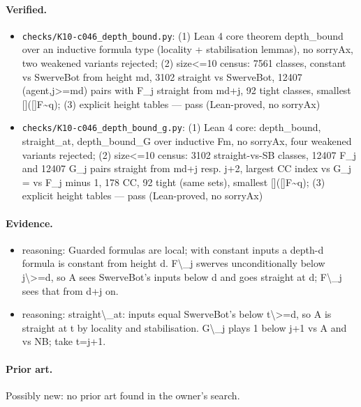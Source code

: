 \documentclass{article}
\begin{document}
\paragraph{Verified.}
\begin{itemize}
\item \texttt{checks/K10-c046\_depth\_bound.py}: (1) Lean 4 core theorem depth\_bound over an inductive formula type (locality + stabilisation lemmas), no sorryAx, two weakened variants rejected; (2) size\textless{}=10 census: 7561 classes, constant vs SwerveBot from height md, 3102 straight vs SwerveBot, 12407 (agent,j\textgreater{}=md) pairs with F\_j straight from md+j, 92 tight classes, smallest []([]F\textbar{}\textasciitilde{}q); (3) explicit height tables --- pass (Lean-proved, no sorryAx)
\item \texttt{checks/K10-c046\_depth\_bound\_g.py}: (1) Lean 4 core: depth\_bound, straight\_at, depth\_bound\_G over inductive Fm, no sorryAx, four weakened variants rejected; (2) size\textless{}=10 census: 3102 straight-vs-SB classes, 12407 F\_j and 12407 G\_j pairs straight from md+j resp. j+2, largest CC index vs G\_j = vs F\_j minus 1, 178 CC, 92 tight (same sets), smallest []([]F\textbar{}\textasciitilde{}q); (3) explicit height tables --- pass (Lean-proved, no sorryAx)
\end{itemize}

\paragraph{Evidence.}
\begin{itemize}
\item reasoning: Guarded formulas are local; with constant inputs a depth-d formula is constant from height d. F\textbackslash{}\_j swerves unconditionally below j\textbackslash{}\textgreater{}=d, so A sees SwerveBot's inputs below d and goes straight at d; F\textbackslash{}\_j sees that from d+j on.
\item reasoning: straight\textbackslash{}\_at: inputs equal SwerveBot's below t\textbackslash{}\textgreater{}=d, so A is straight at t by locality and stabilisation. G\textbackslash{}\_j plays 1 below j+1 vs A and vs NB; take t=j+1.
\end{itemize}

\paragraph{Prior art.} Possibly new: no prior art found in the owner's search.
\end{document}
